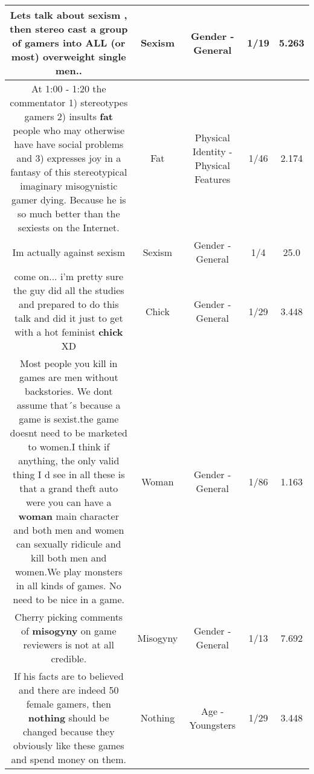 \documentclass[11pt]{article}
\newlength\mylength
\begin{document}
\begin{center}
\begin{longtable}{|C{.65\mylength}|C{.30\mylength}|C{.12\mylength}|C{.12\mylength}|C{.12\mylength}|}
  \small Lets talk about \textbf{sexism} , then stereo cast a group of gamers into ALL (or most) overweight single men..\normalsize   & Sexism & Gender - General & 1/19 & 5.263 \\  \hline
  \small At 1:00 - 1:20 the commentator 1) stereotypes gamers 2) insults \textbf{fat} people who may otherwise have have social problems and 3) expresses joy in a fantasy of this stereotypical imaginary misogynistic gamer dying. Because he is so much better than the sexiests on the Internet.\normalsize   & Fat & Physical Identity - Physical Features & 1/46 & 2.174 \\  \hline
  \small Im actually against sexism\normalsize   & Sexism & Gender - General & 1/4 & 25.0 \\  \hline
  \small come on... i'm pretty sure the guy did all the studies and prepared to do this talk and did it just to get with a hot feminist \textbf{chick} XD\normalsize   & Chick & Gender - General & 1/29 & 3.448 \\  \hline
  \small Most people you kill in games are men without backstories. We dont assume that´s because a game is sexist.the game doesnt need to be marketed to women.I think if anything, the only valid thing I d see in all these is that a grand theft auto were you can have a \textbf{woman} main character and both men and women can sexually ridicule and kill both men and women.We play monsters in all kinds of games. No need to be nice in a game.\normalsize   & Woman & Gender - General & 1/86 & 1.163 \\  \hline
  \small Cherry picking comments of \textbf{misogyny} on game reviewers is not at all credible.\normalsize   & Misogyny & Gender - General & 1/13 & 7.692 \\  \hline
  \small If his facts are to believed and there are indeed 50 female gamers, then \textbf{nothing} should be changed because they obviously like these games and spend money on them.\normalsize   & Nothing & Age - Youngsters & 1/29 & 3.448 \\  \hline

\end{longtable}
\end{center}
\end{document}

